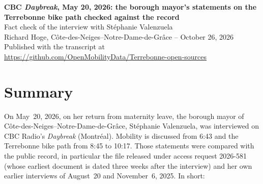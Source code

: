 \documentclass[11pt,letterpaper]{article}
\newcommand{\repourl}{https://github.com/OpenMobilityData/Terrebonne-open-sources}
\newcommand{\repo}[1]{\href{\repourl}{#1}}
\begin{document}
\begin{center}
{\Large\bfseries CBC \emph{Daybreak}, May 20, 2026: the borough mayor's statements on the Terrebonne bike path checked against the record}\\[0.4em]
{\large Fact check of the interview with Stéphanie Valenzuela}\\[0.6em]
Richard Hoge, Côte-des-Neiges--Notre-Dame-de-Grâce -- October 26, 2026\\
Published with the transcript at \repo{\repourl}
\end{center}

\section*{Summary}

On May~20, 2026, on her return from maternity leave, the borough mayor of
Côte-des-Neiges--Notre-Dame-de-Grâce, Stéphanie Valenzuela, was interviewed
on CBC Radio's \emph{Daybreak} (Montréal). Mobility is discussed from 6:43
and the Terrebonne bike path from 8:45 to 10:17. Those statements were
compared with the public record, in particular the file released under access
request 2026-581 (whose earliest document is dated three weeks after the
interview) and her own earlier interviews of August~20 and November~6, 2025.
In short:
\end{document}

